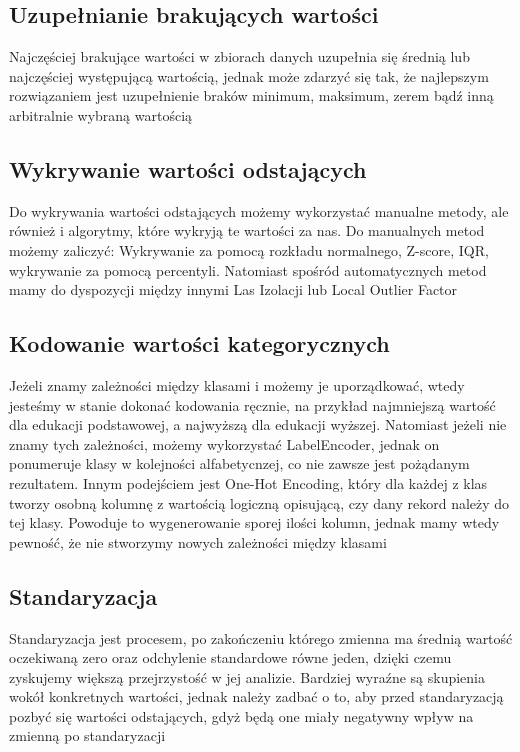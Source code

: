 \documentclass{book}
\begin{document}
\subsection*{Uzupełnianie brakujących wartości}
Najczęściej brakujące wartości w zbiorach danych uzupełnia się średnią 
lub najczęściej występującą wartością, jednak może zdarzyć się tak, 
że najlepszym rozwiązaniem jest uzupełnienie braków minimum, maksimum, 
zerem bądź inną arbitralnie wybraną wartością
\subsection*{Wykrywanie wartości odstających}
Do wykrywania wartości odstających możemy wykorzystać manualne metody, 
ale również i algorytmy, które wykryją te wartości za nas. 
Do manualnych metod możemy zaliczyć: Wykrywanie za pomocą rozkładu 
normalnego, Z-score, IQR, wykrywanie za pomocą percentyli. 
Natomiast spośród automatycznych metod mamy do dyspozycji między innymi 
Las Izolacji lub Local Outlier Factor
\subsection*{Kodowanie wartości kategorycznych}
Jeżeli znamy zależności między klasami i możemy je uporządkować, 
wtedy jesteśmy w stanie dokonać kodowania ręcznie, na przykład 
najmniejszą wartość dla edukacji podstawowej, a najwyższą dla 
edukacji wyższej. Natomiast jeżeli nie znamy tych zależności, 
możemy wykorzystać LabelEncoder, jednak on ponumeruje klasy w 
kolejności alfabetycnzej, co nie zawsze jest pożądanym rezultatem. 
Innym podejściem jest One-Hot Encoding\cite{one_hot_encoding}, który dla każdej z klas 
tworzy osobną kolumnę z wartością logiczną opisującą, czy dany 
rekord należy do tej klasy. Powoduje to wygenerowanie sporej 
ilości kolumn, jednak mamy wtedy pewność, że nie stworzymy 
nowych zależności między klasami
\subsection*{Standaryzacja}
Standaryzacja jest procesem, po zakończeniu którego zmienna 
ma średnią wartość oczekiwaną zero oraz odchylenie standardowe 
równe jeden, dzięki czemu zyskujemy większą przejrzystość w 
jej analizie. Bardziej wyraźne są skupienia wokół konkretnych 
wartości, jednak należy zadbać o to, aby przed standaryzacją 
pozbyć się wartości odstających, gdyż będą one miały negatywny 
wpływ na zmienną po standaryzacji
\end{document}

